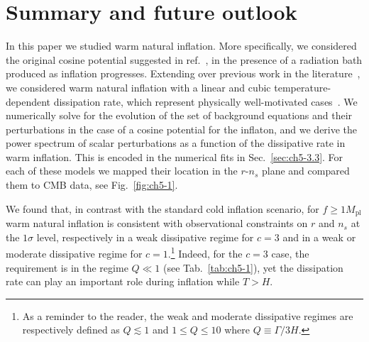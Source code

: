 \section{Summary and future outlook \label{sec:ch5-5}}

In this paper we studied warm natural inflation. More specifically, we considered the original cosine potential suggested in ref.~\cite{Freese:1990rb}, in the presence of a radiation bath produced as inflation progresses. Extending over previous work in the literature~\cite{Visinelli:2011jy, Reyimuaji:2020bkm, Correa:2022ngq}, we considered warm natural inflation with a linear and cubic temperature-dependent dissipation rate, which represent physically well-motivated cases~\cite{Berghaus:2019whh, Berghaus:2020ekh, DeRocco:2021rzv}. We numerically solve for the evolution of the set of background equations and their perturbations in the case of a cosine potential for the inflaton, and we derive the power spectrum of scalar perturbations as a function of the dissipative rate in warm inflation. This is encoded in the numerical fits in Sec.~\ref{sec:ch5-3.3}. For each of these models we mapped their location in the $r$-$n_s$ plane and compared them to CMB data, see Fig.~\ref{fig:ch5-1}.

We found that, in contrast with the standard cold inflation scenario, for $f\geq 1 M_\mathrm{pl}$ warm natural inflation is consistent with observational constraints on $r$ and $n_s$ at the $1\sigma$ level, respectively in a weak dissipative regime for $c=3$ and in a weak or moderate dissipative regime for $c=1$.\footnote{As a reminder to the reader, the weak and moderate dissipative regimes are respectively defined as $Q\lesssim1$ and $1\leq Q\leq 10$ where $Q \equiv \Gamma/3H$.} Indeed, for the $c=3$ case, the requirement is in the regime $Q\ll 1$ (see Tab.~\ref{tab:ch5-1}), yet the dissipation rate can play an important role during inflation while $T>H$.


